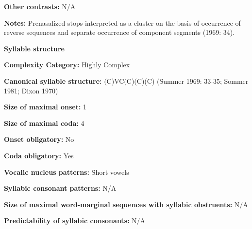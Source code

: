 \begin{styleBody}
\textbf{Other contrasts:} N/A
\end{styleBody}

\begin{styleBody}
\textbf{Notes:} Prenasalized stops interpreted as a cluster on the basis of occurrence of reverse sequences and separate occurrence of component segments (1969: 34).
\end{styleBody}

\begin{styleBody}
\textbf{Syllable structure}
\end{styleBody}

\begin{styleBody}
\textbf{Complexity Category:} Highly Complex
\end{styleBody}

\begin{styleBody}
\textbf{Canonical syllable structure:} (C)VC(C)(C)(C)\textbf{ }(Summer 1969: 33-35; Sommer 1981; Dixon 1970)
\end{styleBody}

\begin{styleBody}
\textbf{Size of maximal onset:} 1
\end{styleBody}

\begin{styleBody}
\textbf{Size of maximal coda:} 4
\end{styleBody}

\begin{styleBody}
\textbf{Onset obligatory:} No
\end{styleBody}

\begin{styleBody}
\textbf{Coda obligatory:} Yes
\end{styleBody}

\begin{styleBody}
\textbf{Vocalic nucleus patterns:} Short vowels
\end{styleBody}

\begin{styleBody}
\textbf{Syllabic consonant patterns:} N/A
\end{styleBody}

\begin{styleBody}
\textbf{Size of maximal word{}-marginal sequences with syllabic obstruents:} N/A
\end{styleBody}

\begin{styleBody}
\textbf{Predictability of syllabic consonants:} N/A
\end{styleBody}

